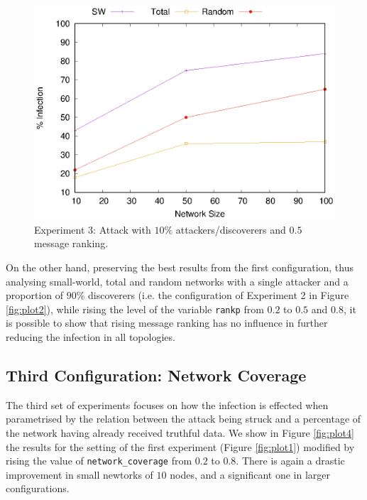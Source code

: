 \documentclass[compsoc, conference, letterpaper, 10pt, times]{IEEEtran}
\begin{document}
\begin{figure}
\includegraphics[scale=0.70]{3rdconfig_10_90}
\caption{Experiment 3: Attack with $10\%$ attackers/discoverers and $0.5$ message ranking.}\label{fig:plot3}
\end{figure}
On the other hand, preserving the best results from the first configuration, thus analysing small-world, total and random networks with a single attacker and a proportion of $90\%$ discoverers (i.e. the configuration of Experiment 2 in Figure \ref{fig:plot2}), while rising the level of the variable \texttt{rankp} from $0.2$ to $0.5$ and $0.8$, it is possible to show that rising message ranking has no influence in further reducing the infection in all topologies.


\subsection{Third Configuration: Network Coverage}

The third set of experiments focuses on how the infection is effected when parametrised by the relation between the attack being struck and a percentage of the network having already received  truthful data. We show in Figure \ref{fig:plot4} the results for the setting of the first experiment (Figure \ref{fig:plot1}) modified by rising the value of  \texttt{network\_coverage} from $0.2$ to $0.8$. There is again a drastic improvement in small newtorks of $10$ nodes, and a significant one in larger configurations.
\end{document}
